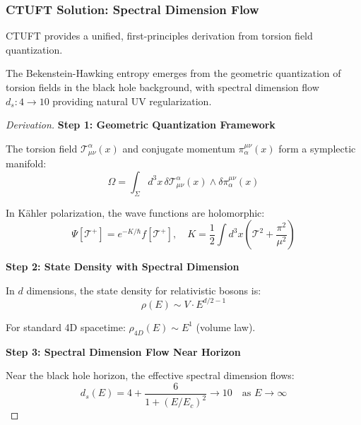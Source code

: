 \subsubsection{CTUFT Solution: Spectral Dimension Flow}

CTUFT provides a unified, first-principles derivation from torsion field quantization.

\begin{theorem}
\label{thm:bh_entropy}
The Bekenstein-Hawking entropy emerges from the geometric quantization of torsion fields in the black hole background, with spectral dimension flow $d_s: 4 \to 10$ providing natural UV regularization.
\end{theorem}

\begin{proof}[Derivation]

\textbf{Step 1: Geometric Quantization Framework}

The torsion field $\mathcal{T}^\alpha_{\mu\nu}(x)$ and conjugate momentum $\pi_\alpha^{\mu\nu}(x)$ form a symplectic manifold:
\begin{equation}
    \Omega = \int_\Sigma d^3x \, \delta \mathcal{T}^\alpha_{\mu\nu}(x) \wedge \delta \pi_\alpha^{\mu\nu}(x)
\end{equation}

In K\"ahler polarization, the wave functions are holomorphic:
\begin{equation}
    \Psi[\mathcal{T}^+] = e^{-K/\hbar} f[\mathcal{T}^+], \quad K = \frac{1}{2}\int d^3x \left(\mathcal{T}^2 + \frac{\pi^2}{\mu^2}\right)
\end{equation}

\textbf{Step 2: State Density with Spectral Dimension}

In $d$ dimensions, the state density for relativistic bosons is:
\begin{equation}
    \rho(E) \sim V \cdot E^{d/2 - 1}
\end{equation}

For standard 4D spacetime: $\rho_{4D}(E) \sim E^1$ (volume law).

\textbf{Step 3: Spectral Dimension Flow Near Horizon}

Near the black hole horizon, the effective spectral dimension flows:
\begin{equation}
    d_s(E) = 4 + \frac{6}{1 + (E/E_c)^2} \to 10 \quad \text{as } E \to \infty
\end{equation}


\end{proof}
